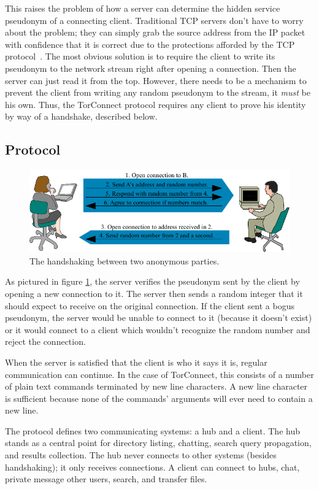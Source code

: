 \documentclass{article}
\begin{document}
This raises the problem of how a server can determine the hidden service pseudonym of a connecting client.  Traditional TCP servers don't have to worry about the problem; they can simply grab the source address from the IP packet with confidence that it is correct due to the protections afforded by the TCP protocol~\cite{wiki-spoofing}.  The most obvious solution is to require the client to write its pseudonym to the network stream right after opening a connection.  Then the server can just read it from the top.  However, there needs to be a mechanism to prevent the client from writing any random pseudonym to the stream, it \emph{must} be his own.  Thus, the TorConnect protocol requires any client to prove his identity by way of a handshake, described below.

\subsection{Protocol}
\begin{figure}
\centering
\includegraphics{handshake.pdf}
\caption{The handshaking between two anonymous parties.}
\label{fig:handshake}
\end{figure}

As pictured in figure \ref{fig:handshake}, the server verifies the pseudonym sent by the client by opening a new connection to it.  The server then sends a random integer that it should expect to receive on the original connection.  If the client sent a bogus pseudonym, the server would be unable to connect to it (because it doesn't exist) or it would connect to a client which wouldn't recognize the random number and reject the connection.

When the server is satisfied that the client is who it says it is, regular communication can continue.  In the case of TorConnect, this consists of a number of plain text commands terminated by new line characters.  A new line character is sufficient because none of the commands' arguments will ever need to contain a new line.

The protocol defines two communicating systems: a hub and a client.  The hub stands as a central point for directory listing, chatting, search query propagation, and results collection.  The hub never connects to other systems (besides handshaking); it only receives connections.  A client can connect to hubs, chat, private message other users, search, and transfer files.
\end{document}
